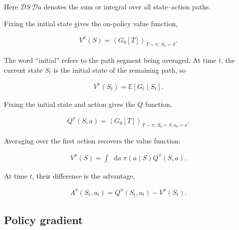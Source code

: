 \documentclass[11pt]{article}
\newcommand{\E}{\mathbb{E}}
\newcommand{\dd}{\mathop{}\!\mathrm{d}}
\begin{document}
Here \(\mathcal D S\,\mathcal D a\) denotes the sum or integral over all
state--action paths.

Fixing the initial state gives the on-policy value function,

\begin{equation}
    \begin{split}
        V^\pi(S)=\left\langle G_0[T]\right\rangle_{T\sim\pi;\,S_0=S}.
    \end{split}
    \label{eq:value}
\end{equation}

The word ``initial'' refers to the path segment being averaged.  At time
\(t\), the current state \(S_t\) is the initial state of the remaining path,
so

\begin{equation}
    \begin{split}
        V^\pi(S_t)=\E\left[G_t\mid S_t\right].
    \end{split}
    \label{eq:value-current-state}
\end{equation}

Fixing the initial state and action gives the \(Q\) function,

\begin{equation}
    \begin{split}
        Q^\pi(S,a)=\left\langle G_0[T]\right\rangle_{T\sim\pi;\,S_0=S,a_0=a}.
    \end{split}
    \label{eq:action-value}
\end{equation}

Averaging over the first action recovers the value function:

\begin{equation}
    \begin{split}
        V^\pi(S)=\int\dd a\;\pi(a\mid S)Q^\pi(S,a).
    \end{split}
    \label{eq:value-from-action-value}
\end{equation}

At time \(t\), their difference is the advantage,

\begin{equation}
    \begin{split}
        A^\pi(S_t,a_t)=Q^\pi(S_t,a_t)-V^\pi(S_t).
    \end{split}
    \label{eq:advantage}
\end{equation}

\subsection{Policy gradient}
\end{document}
